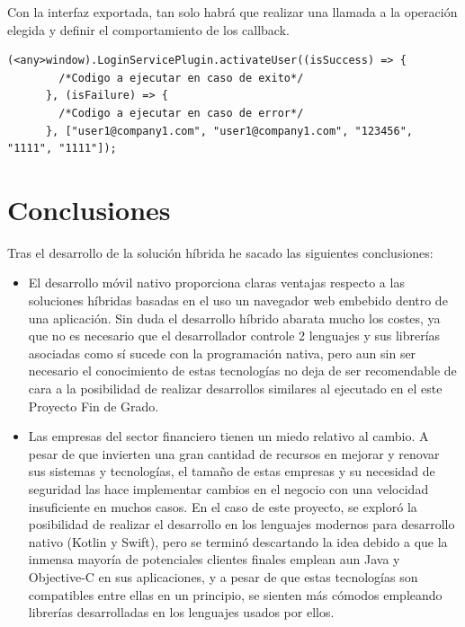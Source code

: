 \documentclass[a4paper, 12pt]{article}
\newenvironment{code}{\captionsetup{type=listing}}{}
\begin{document}
\bigbreak
Con la interfaz exportada, tan solo habrá que realizar una llamada a la operación elegida y definir el comportamiento de los callback.
\begin{code}
\label{code:motifconnector}
\begin{verbatim}
(<any>window).LoginServicePlugin.activateUser((isSuccess) => {
        /*Codigo a ejecutar en caso de exito*/
      }, (isFailure) => {
        /*Codigo a ejecutar en caso de error*/
      }, ["user1@company1.com", "user1@company1.com", "123456", "1111", "1111"]);
\end{verbatim}
\end{code}
\bigbreak
\section{Conclusiones}
\label{sec-5}
Tras el desarrollo de la solución híbrida he sacado las siguientes conclusiones:
\begin{itemize}
\item El desarrollo móvil nativo proporciona claras ventajas respecto a las soluciones híbridas basadas en el uso un navegador web embebido dentro de una aplicación. Sin duda el desarrollo híbrido abarata mucho los costes, ya que no es necesario que el desarrollador controle 2 lenguajes y sus librerías asociadas como sí sucede con la programación nativa, pero aun sin ser necesario el conocimiento de estas tecnologías no deja de ser recomendable de cara a la posibilidad de realizar desarrollos similares al ejecutado en el este Proyecto Fin de Grado.
\item Las empresas del sector financiero tienen un miedo relativo al cambio. A pesar de que invierten una gran cantidad de recursos en mejorar y renovar sus sistemas y tecnologías, el tamaño de estas empresas y su necesidad de seguridad las hace implementar cambios en el negocio con una velocidad insuficiente en muchos casos. En el caso de este proyecto, se exploró la posibilidad de realizar el desarrollo en los lenguajes modernos para desarrollo nativo (Kotlin y Swift), pero se terminó descartando la idea debido a que la inmensa mayoría de potenciales clientes finales emplean aun Java y Objective-C en sus aplicaciones, y a pesar de que estas tecnologías son compatibles entre ellas en un principio, se sienten más cómodos empleando librerías desarrolladas en los lenguajes usados por ellos.
\end{itemize}
\printbibliography[heading=bibnumbered] %
\newpage
\end{document}
